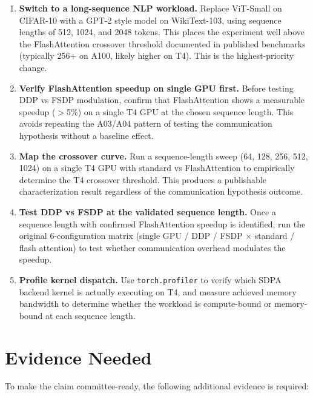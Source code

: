 \documentclass[12pt, a4paper]{article}
\begin{document}
\begin{enumerate}
    \item \textbf{Switch to a long-sequence NLP workload.} Replace ViT-Small on CIFAR-10 with a GPT-2 style model on WikiText-103, using sequence lengths of 512, 1024, and 2048 tokens. This places the experiment well above the FlashAttention crossover threshold documented in published benchmarks (typically 256+ on A100, likely higher on T4). This is the highest-priority change.

    \item \textbf{Verify FlashAttention speedup on single GPU first.} Before testing DDP vs FSDP modulation, confirm that FlashAttention shows a measurable speedup ($>$5\%) on a single T4 GPU at the chosen sequence length. This avoids repeating the A03/A04 pattern of testing the communication hypothesis without a baseline effect.

    \item \textbf{Map the crossover curve.} Run a sequence-length sweep (64, 128, 256, 512, 1024) on a single T4 GPU with standard vs FlashAttention to empirically determine the T4 crossover threshold. This produces a publishable characterization result regardless of the communication hypothesis outcome.

    \item \textbf{Test DDP vs FSDP at the validated sequence length.} Once a sequence length with confirmed FlashAttention speedup is identified, run the original 6-configuration matrix (single GPU / DDP / FSDP $\times$ standard / flash attention) to test whether communication overhead modulates the speedup.

    \item \textbf{Profile kernel dispatch.} Use \texttt{torch.profiler} to verify which SDPA backend kernel is actually executing on T4, and measure achieved memory bandwidth to determine whether the workload is compute-bound or memory-bound at each sequence length.
\end{enumerate}

\section{Evidence Needed}

To make the claim committee-ready, the following additional evidence is required:
\end{document}
